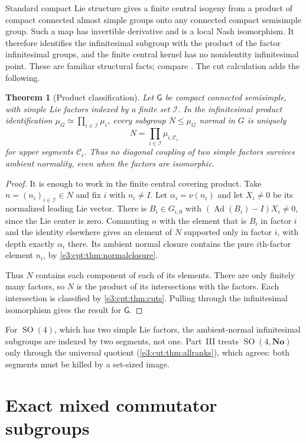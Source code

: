 \documentclass[11pt,letterpaper]{article}
\numberwithin{equation}{section}
\newtheorem{theorem}{Theorem}[section]
\theoremstyle{definition}
\theoremstyle{remark}
\newcommand{\No}{\mathbf{No}}
\newcommand{\SO}{\operatorname{SO}}
\newcommand{\Ad}{\operatorname{Ad}}
\newcommand{\sG}{\mathsf G}
\begin{document}
Standard compact Lie structure gives a finite central isogeny from a product of
compact connected almost simple groups onto any connected compact semisimple
group. Such a map has invertible derivative and is a local Nash isomorphism. It
therefore identifies the infinitesimal subgroup with the product of the factor
infinitesimal groups, and the finite central kernel has no nonidentity
infinitesimal point. These are familiar structural facts; compare
\cite[Section~5]{BP}. The cut calculation adds the following.

\begin{theorem}[Product classification]\label{e3:cpt:thm:productcuts}
Let $\sG$ be compact connected semisimple, with simple Lie factors indexed by a
finite set $\mathcal I$. In the infinitesimal product identification
$\mu_G\simeq\prod_{i\in\mathcal I}\mu_i$, every subgroup $N\le\mu_G$ normal in
$G$ is uniquely
\[
 N=\prod_{i\in\mathcal I}\mu_{i,\mathcal C_i}
\]
for upper segments $\mathcal C_i$. Thus no diagonal coupling of two simple
factors survives ambient normality, even when the factors are isomorphic.
\end{theorem}
\begin{proof}
It is enough to work in the finite central covering product. Take
$n=(n_i)_{i\in\mathcal I}\in N$ and fix $i$ with $n_i\ne I$. Let
$\alpha_i=\nu(n_i)$ and let $X_i\ne0$ be its normalized leading Lie vector.
There is $B_i\in G_{i,0}$ with $(\Ad(B_i)-I)X_i\ne0$, since the Lie center is
zero. Commuting $n$ with the element that is $B_i$ in factor $i$ and the
identity elsewhere gives an element of $N$ supported only in factor $i$, with
depth exactly $\alpha_i$ there. Its ambient normal closure contains the pure
$i$th-factor element $n_i$, by \cref{e3:cpt:thm:normalclosure}.

Thus $N$ contains each component of each of its elements. There are only
finitely many factors, so $N$ is the product of its intersections with the
factors. Each intersection is classified by \cref{e3:cpt:thm:cuts}. Pulling
through the infinitesimal isomorphism gives the result for $\sG$.
\end{proof}

For $\SO(4)$, which has two simple Lie factors, the ambient-normal
infinitesimal subgroups are indexed by two segments, not one. Part~III treats
$\SO(4,\No)$ only through the universal quotient (\cref{e3:cut:thm:allranks}),
which agrees: both segments must be killed by a set-sized image.

\section{Exact mixed commutator subgroups}\label{e3:cpt:sec:mixed}
\end{document}
